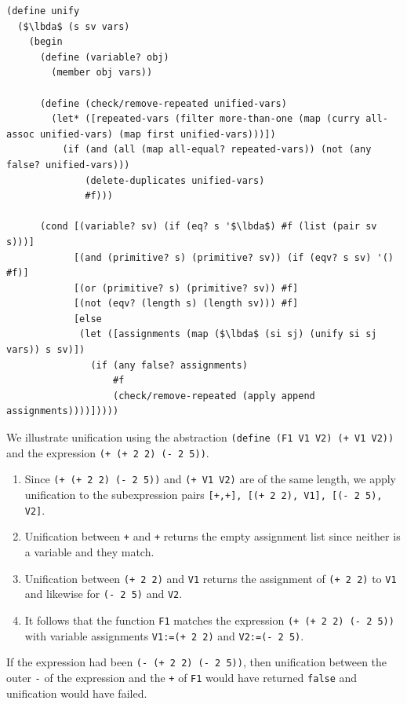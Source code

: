 \documentclass[a4paper,10pt]{article}
\newcommand{\lbda}{\color[rgb]{0,.3,.7} \lambda}
\begin{document}
\begin{lstlisting}[frame=trbl]
(define unify
  ($\lbda$ (s sv vars)
    (begin
      (define (variable? obj)
        (member obj vars))

      (define (check/remove-repeated unified-vars)
        (let* ([repeated-vars (filter more-than-one (map (curry all-assoc unified-vars) (map first unified-vars)))])
          (if (and (all (map all-equal? repeated-vars)) (not (any false? unified-vars)))
              (delete-duplicates unified-vars)
              #f)))
      
      (cond [(variable? sv) (if (eq? s '$\lbda$) #f (list (pair sv s)))]
            [(and (primitive? s) (primitive? sv)) (if (eqv? s sv) '() #f)]
            [(or (primitive? s) (primitive? sv)) #f]
            [(not (eqv? (length s) (length sv))) #f]
            [else
             (let ([assignments (map ($\lbda$ (si sj) (unify si sj vars)) s sv)])
               (if (any false? assignments)
                   #f
                   (check/remove-repeated (apply append assignments))))]))))
\end{lstlisting}

We illustrate unification using the abstraction \texttt{(define (F1 V1 V2) (+ V1 V2))} and the expression \texttt{(+ (+ 2 2) (- 2 5))}.

\begin{enumerate}
  \item Since \texttt{(+ (+ 2 2) (- 2 5))} and \texttt{(+ V1 V2)} are of the same length, we apply unification to the subexpression pairs \texttt{[+,+], [(+ 2 2), V1], [(- 2 5), V2]}.
  \item Unification between \texttt{+} and \texttt{+} returns the empty assignment list since neither is a variable and they match.
  \item Unification between \texttt{(+ 2 2)} and \texttt{V1} returns the assignment of \texttt{(+ 2 2)} to \texttt{V1} and likewise for \texttt{(- 2 5)} and \texttt{V2}.
  \item It follows that the function \texttt{F1} matches the expression \texttt{(+ (+ 2 2) (- 2 5))} with variable assignments \texttt{V1:=(+ 2 2)} and \texttt{V2:=(- 2 5)}.
\end{enumerate}

If the expression had been \texttt{(- (+ 2 2) (- 2 5))}, then unification between the outer \texttt{-} of the expression and the \texttt{+} of \texttt{F1} would have returned \texttt{false} and unification would have failed.
\end{document}
